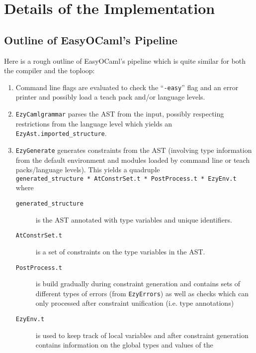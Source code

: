 
\section{Details of the Implementation}

\label{impldets}

\subsection{Outline of EasyOCaml's Pipeline}

Here is a rough outline of EasyOCaml's pipeline which is quite similar 
for both the compiler and the toploop:

\begin{enumerate}
    \item \label{steps} Command line flags are evaluated to check 
        the ``\texttt{-easy}'' flag and an error printer and possibly 
        load a teach pack and/or language levels.
    \item \texttt{EzyCamlgrammar} parses the AST from the input, 
        possibly respecting restrictions from the language level which 
        yields an \texttt{EzyAst.imported\_structure}.
    \item \texttt{EzyGenerate} generates constraints from the AST 
        (involving type information from the default environment and 
        modules loaded by command line or teach packs/language levels).  
        This yields a quadruple 
        \texttt{generated\_structure~*~AtConstrSet.t~*~PostProcess.t~*~EzyEnv.t} 
        where
        \begin{description}
            \item[\texttt{generated\_structure}] is the AST 
                annotated with type variables and unique identifiers.
            \item[\texttt{AtConstrSet.t}] is a set of constraints on 
                the type variables in the AST.
            \item[\texttt{PostProcess.t}] is build gradually during 
                constraint generation and contains sets of different 
                types of errors (from \texttt{EzyErrors}) as well as 
                checks which can only processed after constraint 
                unification (i.e. type annotations)
            \item[\texttt{EzyEnv.t}] is used to keep track of local 
                variables and after constraint generation contains 
                information on the global types and values of the 

\end{description}
\end{enumerate}
